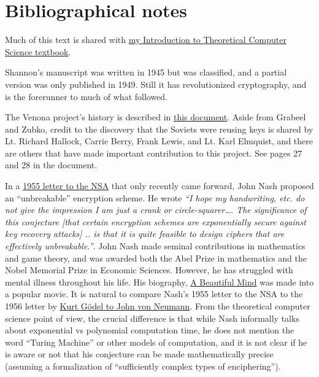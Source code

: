 \section{Bibliographical notes}\label{1-Bibliographical-notes}

Much of this text is shared with \href{https://introtcs.org}{my
Introduction to Theoretical Computer Science textbook}.

Shannon's manuscript was written in 1945 but was classified, and a
partial version was only published in 1949. Still it has revolutionized
cryptography, and is the forerunner to much of what followed.

The Venona project's history is described in
\href{http://nsarchive.gwu.edu/NSAEBB/NSAEBB278/01.PDF}{this document}.
Aside from Grabeel and Zubko, credit to the discovery that the Soviets
were reusing keys is shared by Lt. Richard Hallock, Carrie Berry, Frank
Lewis, and Lt. Karl Elmquist, and there are others that have made
important contribution to this project. See pages 27 and 28 in the
document.

In a
\href{https://www.nsa.gov/news-features/declassified-documents/nash-letters/assets/files/nash_letters1.pdf}{1955
letter to the NSA} that only recently came forward, John Nash proposed
an ``unbreakable'' encryption scheme. He wrote \emph{``I hope my
handwriting, etc. do not give the impression I am just a crank or
circle-squarer\ldots. The significance of this conjecture {[}that
certain encryption schemes are exponentially secure against key recovery
attacks{]} .. is that it is quite feasible to design ciphers that are
effectively unbreakable.''}. John Nash made seminal contributions in
mathematics and game theory, and was awarded both the Abel Prize in
mathematics and the Nobel Memorial Prize in Economic Sciences. However,
he has struggled with mental illness throughout his life. His biography,
\href{https://en.wikipedia.org/wiki/A_Beautiful_Mind_(book)}{A Beautiful
Mind} was made into a popular movie. It is natural to compare Nash's
1955 letter to the NSA to the 1956 letter by
\href{https://www.cs.cmu.edu/~aada/courses/15251s15/www/notes/godel-letter.pdf}{Kurt
Gödel to John von Neumann}. From the theoretical computer science point
of view, the crucial difference is that while Nash informally talks
about exponential vs polynomial computation time, he does not mention
the word ``Turing Machine'' or other models of computation, and it is
not clear if he is aware or not that his conjecture can be made
mathematically precise (assuming a formalization of ``sufficiently
complex types of enciphering'').
